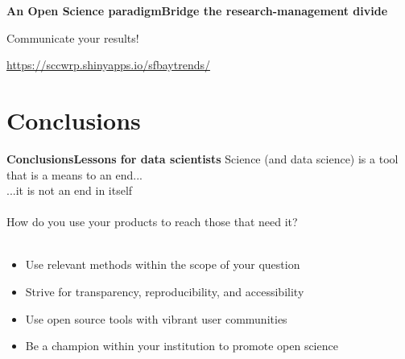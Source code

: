 \documentclass[serif]{beamer}\usepackage[]{graphicx}\usepackage[]{color}
\begin{document}
\begin{frame}{\textbf{An Open Science paradigm}}{\textbf{Bridge the research-management divide}}
\centerline{Communicate your results!}
\centerline{{\small \url{https://sccwrp.shinyapps.io/sfbaytrends/}}}
\begin{center}
\end{center}
\end{frame}

\section{Conclusions}

\begin{frame}{\textbf{Conclusions}}{\textbf{Lessons for data scientists}}
\onslide<+->
Science (and data science) is a tool that is a means to an end... \\
...it is not an end in itself \\~\\
\onslide<+->
How do you use your products to reach those that need it? \\~\\
\onslide<+->
\begin{itemize}
\item Use relevant methods within the scope of your question
\item Strive for transparency, reproducibility, and accessibility
\item Use open source tools with vibrant user communities
\item Be a champion within your institution to promote open science
\end{itemize}
\end{frame}
\end{document}
